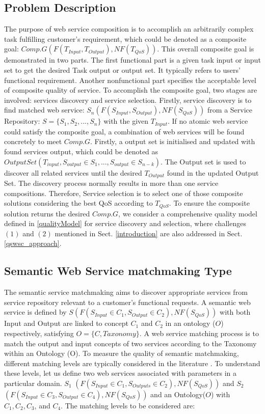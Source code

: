 \documentclass{llncs}
\begin{document}
\subsection{Problem Description}\label{problemDes}

The purpose of web service composition is to accomplish an arbitrarily complex task fulfilling customer's requirement, which could be denoted as a composite goal: $Comp.G(F(T_{Input}, T_{Output}), NF(T_{QoS}))$. This overall composite goal is demonstrated in two parts. The first functional part is a given task input or input set to get the desired Task output or output set. It typically refers to users' functional requirement. Another nonfunctional part specifies the acceptable level of composite quality of service. To accomplish the composite goal, two stages are involved: services discovery and service selection. Firstly, service discovery is to find matched web service: $S_{n}(F(S_{Input}, S_{Output}), NF(S_{QoS}))$ from a Service Repository: $S =  \{S_{1}, S_{2},..., S_{n} \}$ with the given $T_{Input}$. If no atomic web service could satisfy the composite goal, a combination of web services will be found concretely to meet $Comp.G$. Firstly, a output set is initialised and updated with found services output, which could be denoted as $Output Set(T_{input}, S_{output} \in S_1,...,S_{output} \in S_{n-k})$. The Output set is used to discover all related services until the desired $T_{Output}$ found in the updated Output Set. The discovery process normally results in more than one service compositions. Therefore, Service selection is to select one of those composite solutions considering the best QoS according to $T_{QoS}$. To ensure the composite solution returns the desired $Comp.G$, we consider a comprehensive quality model defined in \ref{qualityModel} for service discovery and selection, where challenges $(1)$ and $(2)$ mentioned in Sect. \ref{introduction} are also addressed in Sect. \ref{qswsc_approach}.

\subsection{Semantic Web Service matchmaking Type}\label{semantic Web service Discovery}
The semantic service matchmaking aims to discover appropriate services from service repository relevant to a customer's functional requests. A semantic web service is defined by $S(F(S_{Input}\in C_{1}, S_{Output}\in C_{2}), NF(S_{QoS}))$ with both Input and Output are linked to concept $C_{1}$ and $C_{2}$ in an ontology ($O$) respectively, satisfying $O=\{C, Taxonomy\}$. A web service matching process is to match the output and input concepts of two services according to the Taxonomy within an Ontology (O). To measure the quality of semantic matchmaking, different matching levels are typically considered in the literature \cite{paolucci2002semantic}. To understand these levels, let us define two web services associated with parameters in a particular domain. $S_{1}$ $(F(S_{Input}\in C_{1}, S_{Outputs}\in C_{2}), NF(S_{QoS}))$ and  $S_{2}$ $(F(S_{Input}\in C_{3}, S_{Output}\in C_{4}), NF(S_{QoS}))$ and an Ontology($O$) with $C_{1},C_{2},C_{3}$, and $C_{4}$. The matching levels to be considered are:
\end{document}
